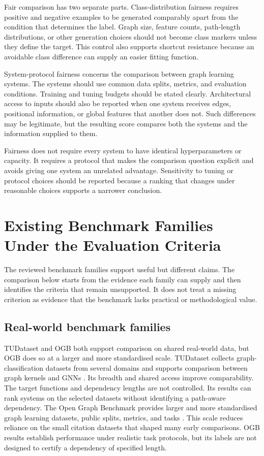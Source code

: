 Fair comparison has two separate parts.
Class-distribution fairness requires positive and negative examples to be generated comparably apart from the condition that determines the label.
Graph size, feature counts, path-length distributions, or other generation choices should not become class markers unless they define the target.
This control also supports shortcut resistance because an avoidable class difference can supply an easier fitting function.

System-protocol fairness concerns the comparison between graph learning systems.
The systems should use common data splits, metrics, and evaluation conditions.
Training and tuning budgets should be stated clearly.
Architectural access to inputs should also be reported when one system receives edges, positional information, or global features that another does not.
Such differences may be legitimate, but the resulting score compares both the systems and the information supplied to them.

Fairness does not require every system to have identical hyperparameters or capacity.
It requires a protocol that makes the comparison question explicit and avoids giving one system an unrelated advantage.
Sensitivity to tuning or protocol choices should be reported because a ranking that changes under reasonable choices supports a narrower conclusion.

\section{Existing Benchmark Families Under the Evaluation Criteria}

The reviewed benchmark families support useful but different claims.
The comparison below starts from the evidence each family can supply and then identifies the criteria that remain unsupported.
It does not treat a missing criterion as evidence that the benchmark lacks practical or methodological value.

\subsection{Real-world benchmark families}
\label{sec:sota-real-benchmarks}

TUDataset and OGB both support comparison on shared real-world data, but OGB does so at a larger and more standardised scale.
TUDataset collects graph-classification datasets from several domains and supports comparison between graph kernels and GNNs \cite{morris2020tudataset}.
Its breadth and shared access improve comparability.
The target functions and dependency lengths are not controlled.
Its results can rank systems on the selected datasets without identifying a path-aware dependency.
The Open Graph Benchmark provides larger and more standardised graph learning datasets, public splits, metrics, and tasks \cite{hu2020ogb}.
This scale reduces reliance on the small citation datasets that shaped many early comparisons.
OGB results establish performance under realistic task protocols, but its labels are not designed to certify a dependency of specified length.

